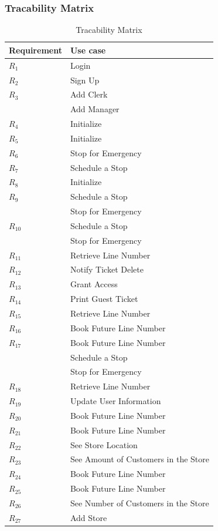 \subsubsection{Tracability Matrix}
\begin{table}[H]
    \begin{tabular}{|p{8cm}|p{8cm}|}
        \hline
        \textbf{Requirement} & \textbf{Use case} \\ \hline
        $R_{1}$ & Login\\ \hline
        $R_{2}$ & Sign Up\\ \hline
        $R_{3}$ & Add Clerk\\
        & Add Manager \\ \hline
        $R_{4}$ & Initialize \\ \hline
        $R_{5}$ & Initialize \\ \hline
        $R_{6}$ & Stop for Emergency\\ \hline
        $R_{7}$ & Schedule a Stop\\ \hline
        $R_{8}$ & Initialize \\ \hline
        $R_{9}$ & Schedule a Stop\\
        & Stop for Emergency \\ \hline
        $R_{10}$ & Schedule a Stop\\
        & Stop for Emergency\\ \hline
        $R_{11}$ & Retrieve Line Number\\ \hline
        $R_{12}$ & Notify Ticket Delete \\ \hline
        $R_{13}$ & Grant Access \\ \hline
        $R_{14}$ & Print Guest Ticket \\ \hline
        $R_{15}$ & Retrieve Line Number \\ \hline
        $R_{16}$ & Book Future Line Number\\ \hline
        $R_{17}$ & Book Future Line Number \\
        & Schedule a Stop \\
        & Stop for Emergency\\ \hline
        $R_{18}$ & Retrieve Line Number \\ \hline
        $R_{19}$ & Update User Information\\ \hline
        $R_{20}$ & Book Future Line Number\\ \hline
        $R_{21}$ & Book Future Line Number\\ \hline
        $R_{22}$ & See Store Location\\ \hline
        $R_{23}$ & See Amount of Customers in the Store\\ \hline
        $R_{24}$ & Book Future Line Number\\ \hline
        $R_{25}$ & Book Future Line Number\\ \hline
        $R_{26}$ & See Number of Customers in the Store\\ \hline
        $R_{27}$ & Add Store \\ \hline
    \end{tabular}
    \caption{Tracability Matrix}
\end{table}
